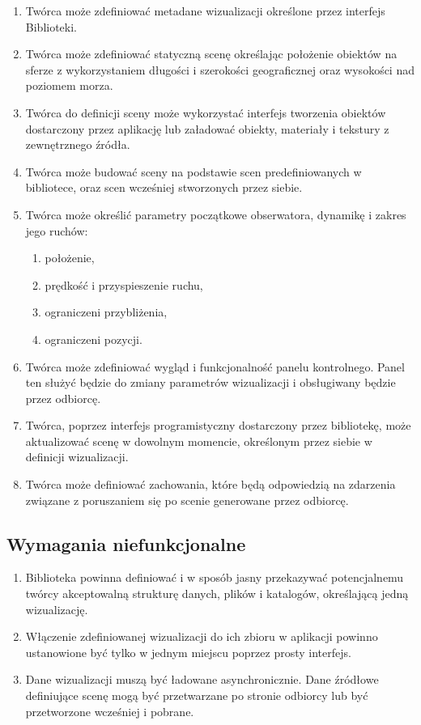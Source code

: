 \begin{enumerate}
    \item Twórca może zdefiniować metadane wizualizacji określone przez interfejs Biblioteki.
    \item Twórca może zdefiniować statyczną scenę określając położenie obiektów na sferze z wykorzystaniem
          długości i szerokości geograficznej oraz wysokości nad poziomem morza.
    \item Twórca do definicji sceny może wykorzystać interfejs tworzenia obiektów dostarczony przez aplikację
          lub załadować obiekty, materiały i tekstury z zewnętrznego źródła.
    \item Twórca może budować sceny na podstawie scen predefiniowanych w bibliotece, oraz scen wcześniej stworzonych przez siebie.
    \item Twórca może określić parametry początkowe obserwatora, dynamikę i zakres jego ruchów:
          \begin{enumerate}
              \item położenie,
              \item prędkość i przyspieszenie ruchu,
              \item ograniczeni przybliżenia,
              \item ograniczeni pozycji.
          \end{enumerate}
    \item Twórca może zdefiniować wygląd i funkcjonalność panelu kontrolnego.
          Panel ten służyć będzie do zmiany parametrów wizualizacji i obsługiwany będzie przez odbiorcę.
    \item Twórca, poprzez interfejs programistyczny dostarczony przez bibliotekę, może aktualizować scenę w dowolnym momencie, określonym przez siebie w definicji wizualizacji.
    \item Twórca może definiować zachowania, które będą odpowiedzią na zdarzenia związane z poruszaniem się po scenie generowane przez odbiorcę.
\end{enumerate}

\subsection{Wymagania niefunkcjonalne}

\begin{enumerate}
    \item Biblioteka powinna definiować i w sposób jasny przekazywać potencjalnemu twórcy akceptowalną strukturę danych, plików i katalogów, określającą jedną wizualizację.
    \item Włączenie zdefiniowanej wizualizacji do ich zbioru w aplikacji powinno ustanowione być tylko w jednym miejscu poprzez prosty interfejs.
    \item Dane wizualizacji muszą być ładowane asynchronicznie. Dane źródłowe definiujące scenę mogą być przetwarzane po stronie odbiorcy lub być przetworzone wcześniej i pobrane.
\end{enumerate}

